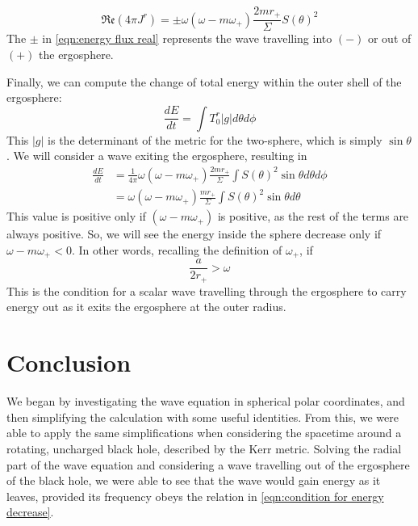 \documentclass[11pt]{article}
\numberwithin{equation}{section}
\numberwithin{figure}{section}
\numberwithin{table}{section}
\begin{document}
\begin{equation}
    \mathfrak{Re}(4\pi J^r)=\pm\omega(\omega-m\omega_+)\frac{2mr_+}{\Sigma}S(\theta)^2
    \label{eqn:energy flux real}
\end{equation}
The $\pm$ in \cref{eqn:energy flux real} represents the wave travelling into $(-)$ or out of $(+)$ the ergosphere.
\par Finally, we can compute the change of total energy within the outer shell of the ergosphere:
\begin{equation*}
    \frac{dE}{dt}=\int T_0^r|g|d\theta d\phi
\end{equation*}
This $|g|$ is the determinant of the metric for the two-sphere, which is simply $\sin\theta$. We will consider a wave exiting the ergosphere, resulting in 
\begin{align*}
    \frac{dE}{dt}&=\frac{1}{4\pi}\omega(\omega-m\omega_+)\frac{2mr_+}{\Sigma}\int S(\theta)^2\sin\theta d\theta d\phi\\
    &=\omega(\omega-m\omega_+)\frac{mr_+}{\Sigma}\int S(\theta)^2\sin\theta d\theta
\end{align*}
This value is positive only if $(\omega-m\omega_+)$ is positive, as the rest of the terms are always positive. So, we will see the energy inside the sphere decrease only if $\omega-m\omega_+<0$. In other words, recalling the definition of $\omega_+$, if 
\begin{equation}
    \frac{a}{2r_+}>\omega
    \label{eqn:condition for energy decrease}
\end{equation}
This is the condition for a scalar wave travelling through the ergosphere to carry energy out as it exits the ergosphere at the outer radius. 

\section{Conclusion}\label{sec:Conclusion}
\par We began by investigating the wave equation in spherical polar coordinates, and then simplifying the calculation with some useful identities. From this, we were able to apply the same simplifications when considering the spacetime around a rotating, uncharged black hole, described by the Kerr metric. Solving the radial part of the wave equation and considering a wave travelling out of the ergosphere of the black hole, we were able to see that the wave would gain energy as it leaves, provided its frequency obeys the relation in \cref{eqn:condition for energy decrease}. 
\end{document}

